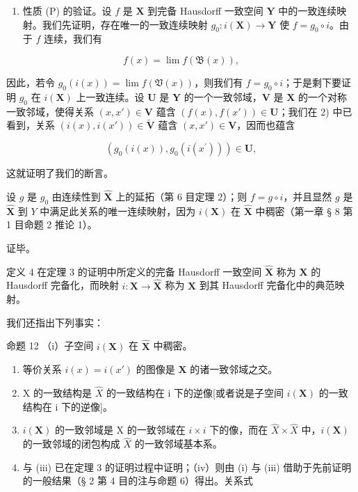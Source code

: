 \begin{enumerate}
\def\labelenumi{\arabic{enumi})}
\setcounter{enumi}{3}
\tightlist
\item
  性质 (P) 的验证。设 \(f\) 是 \(\mathbf{X}\) 到完备 Hausdorff 一致空间 \(\mathbf{Y}\) 中的一致连续映射。我们先证明，存在唯一的一致连续映射 \(g_{0}: i(\mathbf{X}) \to \mathbf{Y}\) 使 \(f = g_{0} \circ i\)。由于 \(f\) 连续，我们有
\end{enumerate}

\[
f (x) = \lim f (\mathfrak {B} (x)),
\]

因此，若令 \(g_0(i(x)) = \lim f(\mathfrak{V}(x))\)，则我们有 \(f = g_0 \circ i\)；于是剩下要证明 \(g_0\) 在 \(i(\mathbf{X})\) 上一致连续。设 \(\mathbf{U}\) 是 \(\mathbf{Y}\) 的一个一致邻域，\(\mathbf{V}\) 是 \(\mathbf{X}\) 的一个对称一致邻域，使得关系 \((x, x') \in \mathbf{V}\) 蕴含 \((f(x), f(x')) \in \mathbf{U}\)；我们在 2) 中已看到，关系 \((i(x), i(x')) \in \tilde{\mathbf{V}}\) 蕴含 \((x, x') \in \mathbf{V}\)，因而也蕴含

\[
(g _ {0} (i (x)), g _ {0} (i (x ^ {\prime}))) \in \mathbf {U},
\]

这就证明了我们的断言。

设 \(g\) 是 \(g_0\) 由连续性到 \(\hat{\mathbf{X}}\) 上的延拓（第 6 目定理 2）；则 \(f = g \circ i\)，并且显然 \(g\) 是 \(\hat{\mathbf{X}}\) 到 \(Y\) 中满足此关系的唯一连续映射，因为 \(i(\mathbf{X})\) 在 \(\hat{\mathbf{X}}\) 中稠密（第一章 § 8 第 1 目命题 2 推论 1）。

证毕。

定义 4 在定理 3 的证明中所定义的完备 Hausdorff 一致空间 \(\hat{\mathbf{X}}\) 称为 \(\mathbf{X}\) 的 Hausdorff 完备化，而映射 \(i: \mathbf{X} \to \hat{\mathbf{X}}\) 称为 \(\mathbf{X}\) 到其 Hausdorff 完备化中的典范映射。

我们还指出下列事实：

命题 12 （i）子空间 \(i(\mathbf{X})\) 在 \(\hat{\mathbf{X}}\) 中稠密。

\begin{enumerate}
\def\labelenumi{(\roman{enumi})}
\setcounter{enumi}{1}
\item
  等价关系 \(i(x) = i(x')\) 的图像是 \(\mathbf{X}\) 的诸一致邻域之交。
\item
  X 的一致结构是 \(\hat{X}\) 的一致结构在 i 下的逆像{[}或者说是子空间 \(i(\mathbf{X})\) 的一致结构在 i 下的逆像{]}。
\item
  \(i(\mathbf{X})\) 的一致邻域是 X 的一致邻域在 \(i \times i\) 下的像，而在 \(\hat{X} \times \hat{X}\) 中，\(i(\mathbf{X})\) 的一致邻域的闭包构成 \(\hat{X}\) 的一致邻域基本系。
\item
  与 (iii) 已在定理 3 的证明过程中证明；（iv）则由 (i) 与 (iii) 借助于先前证明的一般结果（§ 2 第 4 目的注与命题 6）得出。关系式
\end{enumerate}

